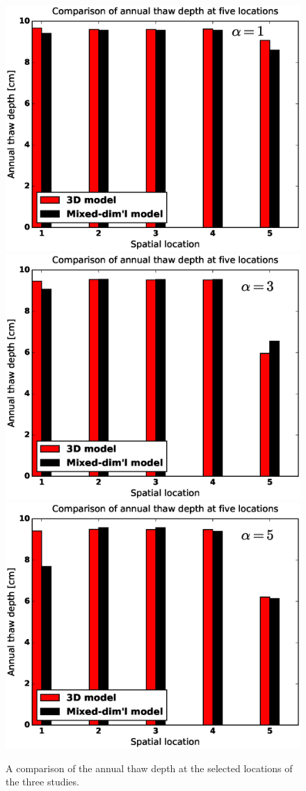 \documentclass[review,11pt]{elsarticle}
\begin{document}
\begin{figure}[!htpb]
\centering
\includegraphics[height = 6.cm, width=10.cm]{figures/comparison/annual-thaw-depth/annual_depth-1.eps}
\includegraphics[height = 6.cm, width=10.cm]{figures/comparison/annual-thaw-depth/annual_depth-3.eps}
\includegraphics[height = 6.cm, width=10.cm]{figures/comparison/annual-thaw-depth/annual_depth-5.eps}
\caption{A comparison of the annual thaw depth at the selected locations of the three studies.}
\label{thaw-depth}
\end{figure}
\end{document}
